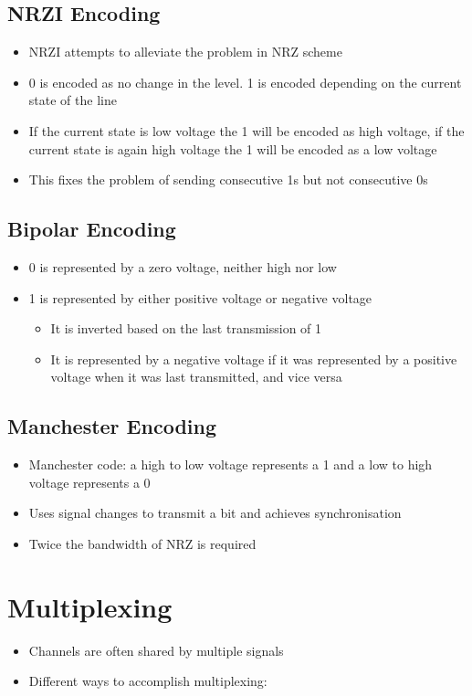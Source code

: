 \documentclass{article}[18pt]
\begin{document}
\subsection{NRZI Encoding}
\begin{itemize}
	\item NRZI attempts to alleviate the problem in NRZ scheme
	\item 0 is encoded as no change in the level. 1 is encoded depending on the current state of the line
	\item If the current state is low voltage the 1 will be encoded as high voltage, if the current state is again high voltage the 1 will be encoded as a low voltage
\end{itemize}
\begin{itemize}
	\item This fixes the problem of sending consecutive 1s but not consecutive 0s
\end{itemize}
\subsection{Bipolar Encoding}
\begin{itemize}
	\item 0 is represented by a zero voltage, neither high nor low
	\item 1 is represented by either positive voltage or negative voltage
	\begin{itemize}
		\item It is inverted based on the last transmission of 1
		\item It is represented by a negative voltage if it was represented by a positive voltage when it was last transmitted, and vice versa
	\end{itemize}
\end{itemize}
\subsection{Manchester Encoding}
\begin{itemize}
	\item Manchester code: a high to low voltage represents a 1 and a low to high voltage represents a 0
	\item Uses signal changes to transmit a bit and achieves synchronisation
	\item Twice the bandwidth of NRZ is required
\end{itemize}
\section{Multiplexing}
\begin{itemize}
	\item Channels are often shared by multiple signals
	\item Different ways to accomplish multiplexing:
\end{itemize}
\end{document}
